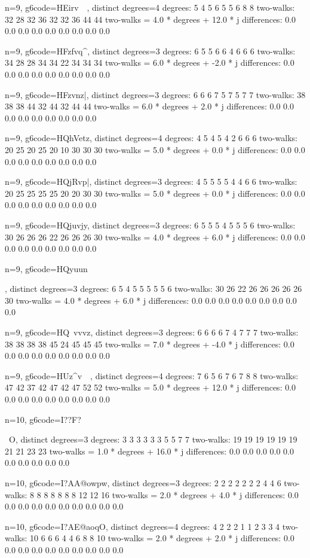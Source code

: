 {{{{{{{{n=9, g6code=HEirv~~, distinct degrees=4
degrees: 5 4 5 6 5 5 6 8 8 
two-walks: 32 28 32 36 32 32 36 44 44 
two-walks = 4.0 * degrees + 12.0 * j
differences: 0.0 0.0 0.0 0.0 0.0 0.0 0.0 0.0 0.0 

n=9, g6code=HFzfvq^, distinct degrees=3
degrees: 6 5 5 6 6 4 6 6 6 
two-walks: 34 28 28 34 34 22 34 34 34 
two-walks = 6.0 * degrees + -2.0 * j
differences: 0.0 0.0 0.0 0.0 0.0 0.0 0.0 0.0 0.0 

n=9, g6code=HFzvnz|, distinct degrees=3
degrees: 6 6 6 7 5 7 5 7 7 
two-walks: 38 38 38 44 32 44 32 44 44 
two-walks = 6.0 * degrees + 2.0 * j
differences: 0.0 0.0 0.0 0.0 0.0 0.0 0.0 0.0 0.0 

n=9, g6code=HQhVetz, distinct degrees=4
degrees: 4 5 4 5 4 2 6 6 6 
two-walks: 20 25 20 25 20 10 30 30 30 
two-walks = 5.0 * degrees + 0.0 * j
differences: 0.0 0.0 0.0 0.0 0.0 0.0 0.0 0.0 0.0 

n=9, g6code=HQjRvp|, distinct degrees=3
degrees: 4 5 5 5 5 4 4 6 6 
two-walks: 20 25 25 25 25 20 20 30 30 
two-walks = 5.0 * degrees + 0.0 * j
differences: 0.0 0.0 0.0 0.0 0.0 0.0 0.0 0.0 0.0 

n=9, g6code=HQjuvjy, distinct degrees=3
degrees: 6 5 5 5 4 5 5 5 6 
two-walks: 30 26 26 26 22 26 26 26 30 
two-walks = 4.0 * degrees + 6.0 * j
differences: 0.0 0.0 0.0 0.0 0.0 0.0 0.0 0.0 0.0 

n=9, g6code=HQyuun{, distinct degrees=3
degrees: 6 5 4 5 5 5 5 5 6 
two-walks: 30 26 22 26 26 26 26 26 30 
two-walks = 4.0 * degrees + 6.0 * j
differences: 0.0 0.0 0.0 0.0 0.0 0.0 0.0 0.0 0.0 

n=9, g6code=HQ~vvvz, distinct degrees=3
degrees: 6 6 6 6 7 4 7 7 7 
two-walks: 38 38 38 38 45 24 45 45 45 
two-walks = 7.0 * degrees + -4.0 * j
differences: 0.0 0.0 0.0 0.0 0.0 0.0 0.0 0.0 0.0 

n=9, g6code=HUz^v~~, distinct degrees=4
degrees: 7 6 5 6 7 6 7 8 8 
two-walks: 47 42 37 42 47 42 47 52 52 
two-walks = 5.0 * degrees + 12.0 * j
differences: 0.0 0.0 0.0 0.0 0.0 0.0 0.0 0.0 0.0 

n=10, g6code=I??F?~}~O, distinct degrees=3
degrees: 3 3 3 3 3 3 5 5 7 7 
two-walks: 19 19 19 19 19 19 21 21 23 23 
two-walks = 1.0 * degrees + 16.0 * j
differences: 0.0 0.0 0.0 0.0 0.0 0.0 0.0 0.0 0.0 0.0 

n=10, g6code=I?AA@owpw, distinct degrees=3
degrees: 2 2 2 2 2 2 2 4 4 6 
two-walks: 8 8 8 8 8 8 8 12 12 16 
two-walks = 2.0 * degrees + 4.0 * j
differences: 0.0 0.0 0.0 0.0 0.0 0.0 0.0 0.0 0.0 0.0 

n=10, g6code=I?AE@aoqO, distinct degrees=4
degrees: 4 2 2 2 1 1 2 3 3 4 
two-walks: 10 6 6 6 4 4 6 8 8 10 
two-walks = 2.0 * degrees + 2.0 * j
differences: 0.0 0.0 0.0 0.0 0.0 0.0 0.0 0.0 0.0 0.0 

}}}}}}}}
